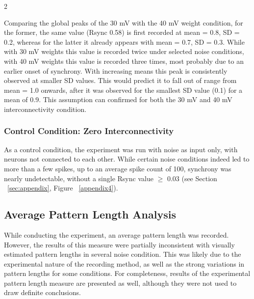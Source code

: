\documentclass[12pt,a4paper]{article}
\begin{document}
    \begin{multicols}{2}
    \raggedcolumns

            Comparing the global peaks of the 30 mV with the 40 mV weight condition, for the former, the same value (Rsync 0.58) is first recorded at mean = 0.8, SD = 0.2, whereas for the latter it already appears with mean = 0.7, SD = 0.3.  While with 30 mV weights this value is recorded twice under selected noise conditions, with 40 mV weights this value is recorded three times, most probably due to an earlier onset of synchrony. With increasing means this peak is consistently observed at smaller SD values. This would predict it to fall out of range from mean = 1.0 onwards, after it was observed for the smallest SD value (0.1) for a mean of 0.9. This assumption can confirmed for both the 30 mV and 40 mV interconnectivity condition.

        \subsubsection{Control Condition: Zero Interconnectivity}
            As a control condition, the experiment was run with noise as input only, with neurons not connected to each other. While certain noise conditions indeed led to more than a few spikes, up to an average spike count of 100, synchrony was nearly undetectable, without a single Rsync value \ensuremath{\geq} 0.03 (see Section ~\ref{sec:appendix}, Figure ~\ref{appendix4}).
            
        \subsection{Average Pattern Length Analysis}
            While conducting the experiment, an average pattern length was recorded. However, the results of this measure were partially inconsistent with visually estimated pattern lengths in several noise condition. This was likely due to the experimental nature of the recording method, as well as the strong variations in pattern lengths for some conditions. For completeness, results of the experimental pattern length measure are presented as well, although they were not used to draw definite conclusions.
            

\end{multicols}
\end{document}
